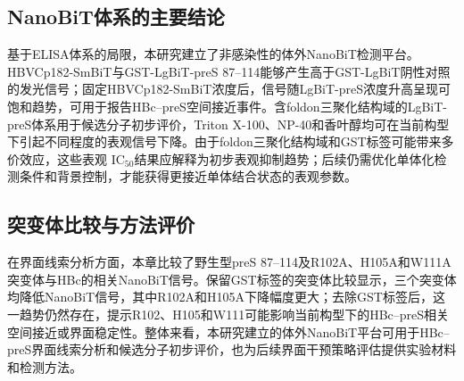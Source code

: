 \subsection{NanoBiT体系的主要结论}

基于ELISA体系的局限，本研究建立了非感染性的体外NanoBiT检测平台。HBVCp182-SmBiT与GST-LgBiT-preS 87--114能够产生高于GST-LgBiT阴性对照的发光信号；固定HBVCp182-SmBiT浓度后，信号随LgBiT-preS浓度升高呈现可饱和趋势，可用于报告HBc--preS空间接近事件。含foldon三聚化结构域的LgBiT-preS体系用于候选分子初步评价，Triton X-100、NP-40和香叶醇均可在当前构型下引起不同程度的表观信号下降。由于foldon三聚化结构域和GST标签可能带来多价效应，这些表观 IC$_{50}$结果应解释为初步表观抑制趋势；后续仍需优化单体化检测条件和背景控制，才能获得更接近单体结合状态的表观参数。

\subsection{突变体比较与方法评价}

在界面线索分析方面，本章比较了野生型preS 87--114及R102A、H105A和W111A突变体与HBc的相关NanoBiT信号。保留GST标签的突变体比较显示，三个突变体均降低NanoBiT信号，其中R102A和H105A下降幅度更大；去除GST标签后，这一趋势仍然存在，提示R102、H105和W111可能影响当前构型下的HBc--preS相关空间接近或界面稳定性。整体来看，本研究建立的体外NanoBiT平台可用于HBc--preS界面线索分析和候选分子初步评价，也为后续界面干预策略评估提供实验材料和检测方法。
